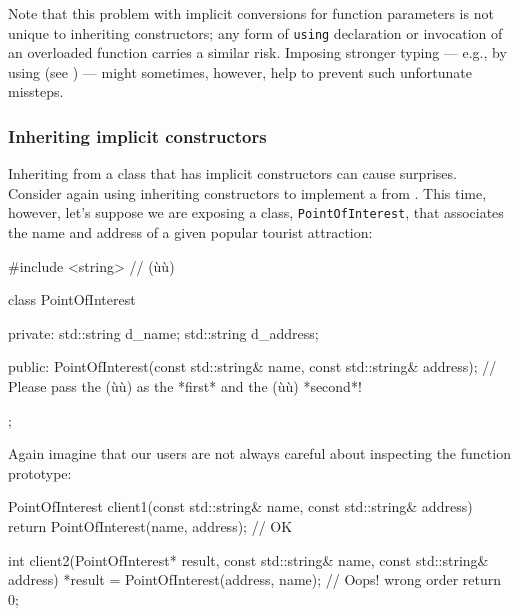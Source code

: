 Note that this problem with implicit conversions for function parameters is not unique
to inheriting constructors; any form of \lstinline!using! declaration or
invocation of an overloaded function carries a similar risk. Imposing
stronger typing --- e.g., by using  (see ) 
--- might sometimes, however, help to prevent such
unfortunate missteps.

\subsubsection[Inheriting \emph{implicit} constructors]{Inheriting {\sfbsubsubsecitalRomeo implicit} constructors}\label{beware-of-inheriting-implicit-constructors}

Inheriting from a class that has implicit constructors can cause
surprises. Consider again using inheriting constructors to
implement a  from . 
This time, however, let's suppose we are
exposing a class,
\lstinline!PointOfInterest!, that associates the name and address of a
given popular tourist attraction:

\begin{emcppslisting}[emcppsbatch=e10]
#include <string>  // (ù{}ù)

class PointOfInterest
{
private:
    std::string d_name;
    std::string d_address;

public:
    PointOfInterest(const std::string& name, const std::string& address);
        // Please pass the (ù{}ù) as the *first* and the (ù{}ù) *second*!
};
\end{emcppslisting}
    
\noindent Again imagine that our users are not always careful about inspecting the
function prototype:

\begin{emcppslisting}[emcppsbatch=e10]
PointOfInterest client1(const std::string& name, const std::string& address)
{
    return PointOfInterest(name, address);  // OK
}

int client2(PointOfInterest*   result,                                          
            const std::string& name,                                            
            const std::string& address)
{
    *result = PointOfInterest(address, name);  // Oops! wrong order
    return 0;
}
\end{emcppslisting}
    
